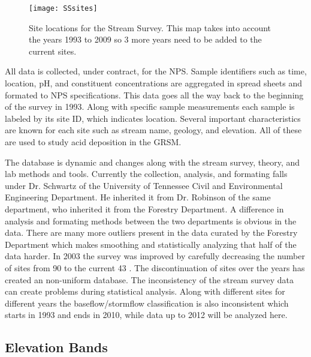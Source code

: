 \begin{figure}[h!]
  \centering
  \texttt{[image: SSsites]}\\
  \caption{Site locations for the Stream Survey.  This map takes into account the years 1993 to 2009 so 3 more years need to be added to the current sites. }\label{fig:SSsites}
\end{figure}

All data is collected, under contract, for the NPS.
Sample identifiers such as time, location, pH, and constituent concentrations are aggregated in spread sheets and formated to NPS specifications.
This data goes all the way back to the beginning of the survey in 1993.
Along with specific sample measurements each sample is labeled by its site ID, which indicates location.
Several important characteristics are known for each site such as stream name, geology, and elevation.
All of these are used to study acid deposition in the GRSM.

The database is dynamic and changes along with the stream survey, theory,  and lab methods and tools.
Currently the collection, analysis, and formating falls under Dr. Schwartz of the University of Tennessee Civil and Environmental Engineering Department.
He inherited it from Dr. Robinson of the same department, who inherited it from the Forestry Department.
A difference in analysis and formating methods between the two departments is obvious in the data.
There are many more outliers present in the data curated by the Forestry Department which makes smoothing and statistically analyzing that half of the data harder.
In 2003 the survey was improved by carefully decreasing the number of  sites from 90 to the current 43 \citep{odom2003}.
The discontinuation of sites over the years has created an non-uniform database.
The inconsistency of the stream survey data can create problems during statistical analysis.
Along with different sites for different years the baseflow/stormflow classification is also inconsistent which starts in 1993 and ends in 2010, while data up to 2012 will be analyzed here.

\subsection{Elevation Bands}

